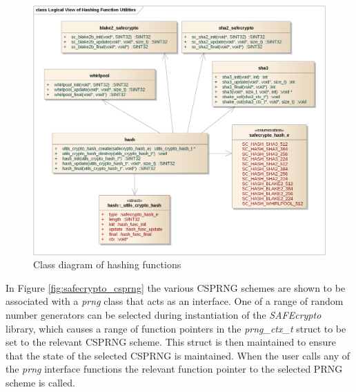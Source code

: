 \begin{figure}[!h]
\centering
\includegraphics[width=\textwidth]{libsafecrypto_hash_logical_view.png}
\caption{Class diagram of hashing functions}
\label{fig:safecrypto_hashing}
\end{figure}

In Figure \ref{fig:safecrypto_csprng} the various CSPRNG schemes are shown to be associated with a \textit{prng} class that acts as an interface. One of a range of random number generators can be selected during instantiation of the \textit{SAFEcrypto} library, which causes a range of function pointers in the \textit{prng\_ctx\_t} struct to be set to the relevant CSPRNG scheme. This struct is then maintained to ensure that the state of the selected CSPRNG is maintained. When the user calls any of the \textit{prng} interface functions the relevant function pointer to the selected PRNG scheme is called.

